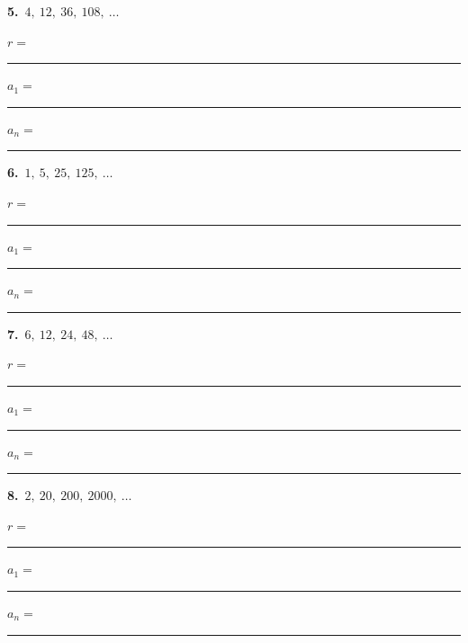 \documentclass[11pt,letterpaper]{article}
\begin{document}
\needspace{2.3cm}\par\vspace{3mm}\noindent\begin{minipage}[t]{0.48\linewidth}{\color{fmturn}\bfseries 5.}\ $4,\ 12,\ 36,\ 108,\ \ldots$\par\vspace{2mm}\hspace*{4mm}$r=$\,\rule{1.2cm}{0.4pt}\par\vspace{2.5mm}\hspace*{4mm}$a_1=$\,\rule{1.4cm}{0.4pt}\quad $a_n=$\,\rule{2.6cm}{0.4pt}\end{minipage}\hfill\begin{minipage}[t]{0.48\linewidth}{\color{fmturn}\bfseries 6.}\ $1,\ 5,\ 25,\ 125,\ \ldots$\par\vspace{2mm}\hspace*{4mm}$r=$\,\rule{1.2cm}{0.4pt}\par\vspace{2.5mm}\hspace*{4mm}$a_1=$\,\rule{1.4cm}{0.4pt}\quad $a_n=$\,\rule{2.6cm}{0.4pt}\end{minipage}\par\vspace{1.3cm}
\needspace{2.3cm}\par\vspace{3mm}\noindent\begin{minipage}[t]{0.48\linewidth}{\color{fmturn}\bfseries 7.}\ $6,\ 12,\ 24,\ 48,\ \ldots$\par\vspace{2mm}\hspace*{4mm}$r=$\,\rule{1.2cm}{0.4pt}\par\vspace{2.5mm}\hspace*{4mm}$a_1=$\,\rule{1.4cm}{0.4pt}\quad $a_n=$\,\rule{2.6cm}{0.4pt}\end{minipage}\hfill\begin{minipage}[t]{0.48\linewidth}{\color{fmturn}\bfseries 8.}\ $2,\ 20,\ 200,\ 2000,\ \ldots$\par\vspace{2mm}\hspace*{4mm}$r=$\,\rule{1.2cm}{0.4pt}\par\vspace{2.5mm}\hspace*{4mm}$a_1=$\,\rule{1.4cm}{0.4pt}\quad $a_n=$\,\rule{2.6cm}{0.4pt}\end{minipage}\par\vspace{1.3cm}
\end{document}
